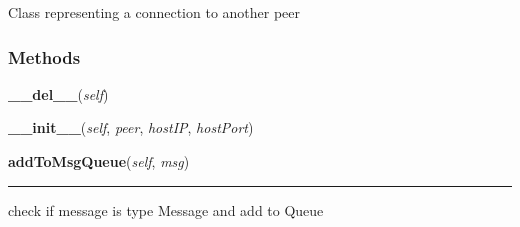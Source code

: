     \label{host:Host}
Class representing a connection to another peer



  \subsubsection{Methods}

    \label{host:Host:__del__}

    \vspace{0.5ex}

\hspace{.8\funcindent}\begin{boxedminipage}{\funcwidth}

    \raggedright \textbf{\_\_del\_\_}(\textit{self})

\setlength{\parskip}{2ex}
\setlength{\parskip}{1ex}
    \end{boxedminipage}

    \label{host:Host:__init__}

    \vspace{0.5ex}

\hspace{.8\funcindent}\begin{boxedminipage}{\funcwidth}

    \raggedright \textbf{\_\_init\_\_}(\textit{self}, \textit{peer}, \textit{hostIP}, \textit{hostPort})

\setlength{\parskip}{2ex}
\setlength{\parskip}{1ex}
    \end{boxedminipage}

    \label{host:Host:addToMsgQueue}

    \vspace{0.5ex}

\hspace{.8\funcindent}\begin{boxedminipage}{\funcwidth}

    \raggedright \textbf{addToMsgQueue}(\textit{self}, \textit{msg})

    \vspace{-1.5ex}

    \rule{\textwidth}{0.5\fboxrule}
\setlength{\parskip}{2ex}
    check if message is type Message and add to Queue

\setlength{\parskip}{1ex}
    \end{boxedminipage}

